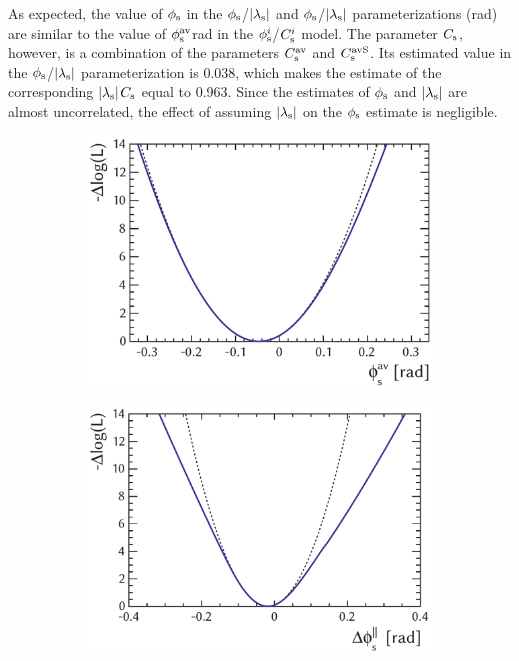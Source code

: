 As expected, the value of $\phi_\text{s}$ in the $\phi_\text{s}$/$|{\lambda_{\text{s}}}|$ and $\phi_\text{s}$/$|{\lambda_{\text{s}}}|$ parameterizations
(\unitsp{}rad) are similar to the value of $\phi_\text{s}^{\text{av}}$\texteq{}\unitsp{}rad in the $\phi_\text{s}^{i}$/$C_\text{s}^{i}$ model.
The parameter $C_\text{s}$, however, is a combination of the parameters $C_\text{s}^\text{av}$ and $C_\text{s}^\text{avS}$. Its estimated value in the $\phi_\text{s}$/$|{\lambda_{\text{s}}}|$
parameterization is 0.038, which makes the estimate of the corresponding $|{\lambda_{\text{s}}}|$\textminus$C_\text{s}$ equal to
0.963. Since the estimates of $\phi_\text{s}$ and $|{\lambda_{\text{s}}}|$ are almost uncorrelated, the effect of assuming $|{\lambda_{\text{s}}}|$ on the
$\phi_\text{s}$ estimate is negligible.

\begin{figure}[tb]
  \centering
  \begin{subfigure}{0.49\textwidth}
    \includegraphics[width=\textwidth]{graphics/results/NLL_polarDep_phiCPAv}
    \caption{}
  \end{subfigure}
  \hfill%
  \begin{subfigure}{0.49\textwidth}
    \includegraphics[width=\textwidth]{graphics/results/NLL_polarDep_phiCPRel_Apar}
    \caption{}
  \end{subfigure}


\end{figure}
